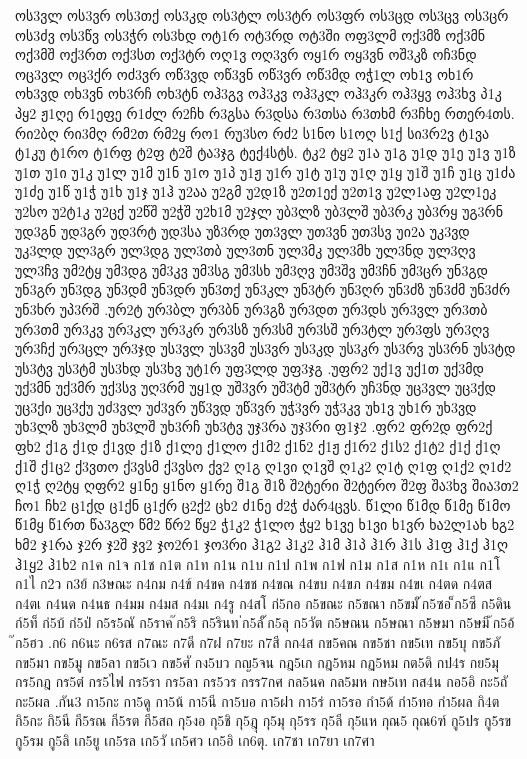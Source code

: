 {{ოს3ვლ
ოს3ვრ
ოს3თქ
ოს3კდ
ოს3ტლ
ოს3ტრ
ოს3ფრ
ოს3ცდ
ოს3ცვ
ოს3ცრ
ოს3ძვ
ოს3წვ
ოს3ჭრ
ოს3ხდ
ოტ1რ
ოტ3რდ
ოტ3ში
ოფ3ლმ
ოქ3მზ
ოქ3მნ
ოქ3მშ
ოქ3რთ
ოქ3სთ
ოქ3ტრ
ოღ1ვ
ოღ3ვრ
ოყ1რ
ოყ3ვნ
ოშ3კზ
ოჩ3ნდ
ოც3ვლ
ოც3ქრ
ოძ3ვრ
ოწ3ვდ
ოწ3ვნ
ოწ3ვრ
ოწ3მდ
ოჭ1ლ
ოხ1ვ
ოხ1რ
ოხ3ვდ
ოხ3ვნ
ოხ3რჩ
ოხ3ტნ
ოჰ3გვ
ოჰ3კვ
ოჰ3კლ
ოჰ3კრ
ოჰ3ყვ
ოჰ3ხვ
პ1კ
პყ2
ჟ1ღე
რ1ეფე
რ1ძლ
რ2ჩხ
რ3გსა
რ3დსა
რ3თსა
რ3თხმ
რ3ჩხე
რთერ4თს.
რი2ბღ
რი3მღ
რმ2თ
რმ2ყ
რო1
რუ3სო
რძ2
ს1ნო
ს1ოღ
ს1ქ
სი3რ2ვ
ტ1ვა
ტ1კუ
ტ1რო
ტ1რფ
ტ2ფ
ტ2შ
ტა3ჯგ
ტექ4სტს.
ტკ2
ტყ2
უ1ა
უ1გ
უ1დ
უ1ე
უ1ვ
უ1ზ
უ1თ
უ1ი
უ1კ
უ1ლ
უ1მ
უ1ნ
უ1ო
უ1პ
უ1ჟ
უ1რ
უ1ტ
უ1უ
უ1ღ
უ1ყ
უ1შ
უ1ჩ
უ1ც
უ1ძა
უ1ძე
უ1წ
უ1ჭ
უ1ხ
უ1ჯ
უ1ჰ
უ2აა
უ2გმ
უ2დ1ზ
უ2თ1ექ
უ2თ1ვ
უ2ლ1აფ
უ2ლ1ეკ
უ2სო
უ2ტ1კ
უ2ცქ
უ2წშ
უ2ჭშ
უ2ხ1მ
უ2ჯლ
უბ3ლზ
უბ3ლშ
უბ3რკ
უბ3რყ
უგ3რნ
უდ3გნ
უდ3გრ
უდ3რტ
უდ3სა
უზ3რდ
უთ3ვლ
უთ3ვნ
უთ3სვ
უი2ა
უკ3ვდ
უკ3ლდ
ულ3გრ
ულ3დგ
ულ3თბ
ულ3თნ
ულ3მკ
ულ3მხ
ულ3ნდ
ულ3ღვ
ულ3ჩვ
უმ2ტყ
უმ3დგ
უმ3კვ
უმ3სგ
უმ3სხ
უმ3ღვ
უმ3შვ
უმ3ჩნ
უმ3ცრ
უნ3გდ
უნ3გრ
უნ3დგ
უნ3დმ
უნ3დრ
უნ3თქ
უნ3კლ
უნ3ტრ
უნ3ღრ
უნ3ძზ
უნ3ძმ
უნ3ძრ
უნ3ხრ
უპ3რშ
.ურ2ტ
ურ3ბლ
ურ3ბნ
ურ3გზ
ურ3დთ
ურ3დს
ურ3ვლ
ურ3თბ
ურ3თმ
ურ3კვ
ურ3კლ
ურ3კრ
ურ3სზ
ურ3სმ
ურ3სშ
ურ3ტლ
ურ3ფს
ურ3ღვ
ურ3ჩქ
ურ3ცლ
ურ3ჯდ
უს3ვლ
უს3ვმ
უს3ვრ
უს3კდ
უს3კრ
უს3რვ
უს3რნ
უს3ტდ
უს3ტვ
უს3ტმ
უს3ხდ
უს3ხვ
უტ1რ
უფ3ლდ
უფ3ჯგ
.უფრ2
უქ1ვ
უქ1თ
უქ3მდ
უქ3მნ
უქ3მრ
უქ3სვ
უღ3რმ
უყ1დ
უშ3ვრ
უშ3ტმ
უშ3ტრ
უჩ3ნდ
უც3ვლ
უც3ქდ
უც3ქი
უც3ქუ
უძ3ვლ
უძ3ვრ
უწ3ვდ
უწ3ვრ
უჭ3ვრ
უჭ3კვ
უხ1ვ
უხ1რ
უხ3ვდ
უხ3ლზ
უხ3ლმ
უხ3ლშ
უხ3რჩ
უხ3ტვ
უჯ3რა
უჯ3რი
ფ1ჯ2
.ფრ2
ფრ2დ
ფრ2ქ
ფხ2
ქ1გ
ქ1დ
ქ1ვდ
ქ1ზ
ქ1ლე
ქ1ლო
ქ1მ2
ქ1ნ2
ქ1ჟ
ქ1რ2
ქ1ს2
ქ1ტ2
ქ1ქ
ქ1ღ
ქ1შ
ქ1ც2
ქ3ვთო
ქ3ვსმ
ქ3ვსო
ქვ2
ღ1გ
ღ1ვი
ღ1ვშ
ღ1კ2
ღ1ტ
ღ1ფ
ღ1ქ2
ღ1ძ2
ღ1ჭ
ღ2ტყ
ღფრ2
ყ1ნე
ყ1ნო
ყ1რე
შ1გ
შ1ზ
შ2ტერი
შ2ტერო
შ2ფ
შა3ხვ
შია3თ2
ჩო1
ჩხ2
ც1ქდ
ც1ქნ
ც1ქრ
ც2ქ2
ცხ2
ძ1ნე
ძ2ჭ
ძარ4ცვს.
წ1ლი
წ1მდ
წ1მე
წ1მო
წ1მყ
წ1რთ
წა3გლ
წმ2
წრ2
წყ2
ჭ1კ2
ჭ1ლო
ჭყ2
ხ1ვე
ხ1ვი
ხ1ვრ
ხა2ლ1ახ
ხგ2
ხმ2
ჯ1რა
ჯ2რ
ჯ2შ
ჯვ2
ჯო2რ1
ჯო3რი
ჰ1გ2
ჰ1კ2
ჰ1მ
ჰ1პ
ჰ1რ
ჰ1ს
ჰ1ფ
ჰ1ქ
ჰ1ღ
ჰ1ყ2
ჰ1ხ2
ก1ค
ก1จ
ก1ช
ก1ต
ก1ท
ก1น
ก1บ
ก1ป
ก1พ
ก1ฟ
ก1ม
ก1ส
ก1ห
ก1เ
ก1แ
ก1โ
ก1ไ
ก2ว
ก3ย้
ก3ษณะ
ก4กม
ก4ข์
ก4ขค
ก4ขช
ก4ขณ
ก4ขบ
ก4ขภ
ก4ขม
ก4ขเ
ก4ตด
ก4ตส
ก4ตเ
ก4นด
ก4นธ
ก4มม
ก4มส
ก4มเ
ก4รู
ก4สโ
ก่5กอ
ก5ขณะ
ก5ขณา
ก5ขมั
๊ก5ซอ
็ก5ซี
ก5ดิน
ก์5ท็
ก่5บ้
ก่5ป่
ก5ร5ณั
ก5ราค
๊ก5ริ
ก5รินท
่ก5ลั
๊ก5ลุ
ก5วัต
ก5ษณน
ก5ษณา
ก5ษมา
ก5ษมี
้ก5อ้
๊ก5ฮว
.ก6
ก6นะ
ก6รส
ก7ณะ
ก7ดี
ก7ฝ
ก7ยะ
ก7สี
กก4ส
กข5คณ
กข5ชา
กข5เท
กข5บุ
กข5ภั
กข5มา
กข5มู
กข5ลา
กข5เว
กข5ศั
กง5บว
กญ5จน
กฎ5เก
กฎ5หม
กฏ5หม
กต5ดิ
กป4ร
กย5มุ
กร5กฎ
กร5ต๋
กร5ไฟ
กร5รา
กร5ลา
กร5วร
กรร7กศ
กล5นค
กล5มห
กษ5เท
กส4น
กอ5อิ
กะ5ถั
กะ5ผล
.กัน3
กา5กะ
กา5ดู
กา5น้
กา5นี
กา5บอ
กา5ฝา
กา5ร่
กา5รอ
กำ5ด้
กำ5ทอ
กำ5ผล
กิ4ต
กิ5กะ
กิ5นี
กี5รณ
กี5รต
กี5สถ
กุ5งอ
กุ5ชิ
กุ5ฎุ
กุ5มุ
กุ5รร
กุ5ลี
กุ5แห
กุณ5
กุณ6ฑ์
กู5ปร
กู5รข
กู5รม
กู5ลิ
เก5ยู
เก5รล
เก5วั
เก5ศว
เก5อิ
เก6ตุ.
เก7ชา
เก7ยา
เก7ศา
}}
